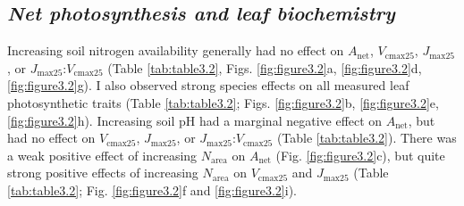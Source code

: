 \newpage
\subsection{\textit{Net photosynthesis and leaf biochemistry}}
\noindent Increasing soil nitrogen availability generally had no effect on $A_\mathrm{net}$, $V_\mathrm{cmax25}$, $J_\mathrm{max25}$, or $J_\mathrm{max25}$:$V_\mathrm{cmax25}$ (Table \ref{tab:table3.2}, Figs. \ref{fig:figure3.2}a, \ref{fig:figure3.2}d, \ref{fig:figure3.2}g). I also observed strong species effects on all measured leaf photosynthetic traits (Table \ref{tab:table3.2}; Figs. \ref{fig:figure3.2}b, \ref{fig:figure3.2}e, \ref{fig:figure3.2}h). Increasing soil pH had a marginal negative effect on $A_\mathrm{net}$, but had no effect on $V_\mathrm{cmax25}$, $J_\mathrm{max25}$, or $J_\mathrm{max25}$:$V_\mathrm{cmax25}$ (Table \ref{tab:table3.2}). There was a weak positive effect of increasing $N_\mathrm{area}$ on $A_\mathrm{net}$ (Fig. \ref{fig:figure3.2}c), but quite strong positive effects of increasing $N_\mathrm{area}$ on $V_\mathrm{cmax25}$ and $J_\mathrm{max25}$ (Table \ref{tab:table3.2}; Fig. \ref{fig:figure3.2}f and \ref{fig:figure3.2}i).
\clearpage
    
